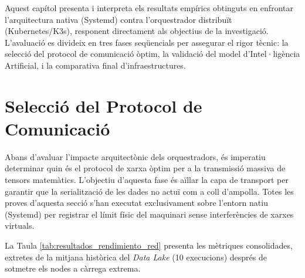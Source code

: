 %

Aquest capítol presenta i interpreta els resultats empírics obtinguts en enfrontar l'arquitectura nativa (Systemd) contra l'orquestrador distribuït (Kubernetes/K3s), responent directament als objectius de la investigació. L'avaluació es divideix en tres fases seqüencials per assegurar el rigor tècnic: la selecció del protocol de comunicació òptim, la validació del model d'Intel·ligència Artificial, i la comparativa final d'infraestructures.

\section{Selecció del Protocol de Comunicació}
\label{sec:protocol}

Abans d'avaluar l'impacte arquitectònic dels orquestradors, és imperatiu determinar quin és el protocol de xarxa òptim per a la transmissió massiva de tensors matemàtics. L'objectiu d'aquesta fase és aïllar la capa de transport per garantir que la serialització de les dades no actuï com a coll d'ampolla. Totes les proves d'aquesta secció s'han executat exclusivament sobre l'entorn natiu (Systemd) per registrar el límit físic del maquinari sense interferències de xarxes virtuals.

La Taula \ref{tab:resultados_rendimiento_red} presenta les mètriques consolidades, extretes de la mitjana històrica del \textit{Data Lake} (10 execucions) després de sotmetre els nodes a càrrega extrema.

\begin{table}[h]
    \centering
    \renewcommand{\arraystretch}{1.2}
    \caption{Resultats consolidats de rendiment de xarxa per protocol a l'Edge (mitjana de 10 execucions).}
    \label{tab:resultados_rendimiento_red}
\end{table}

